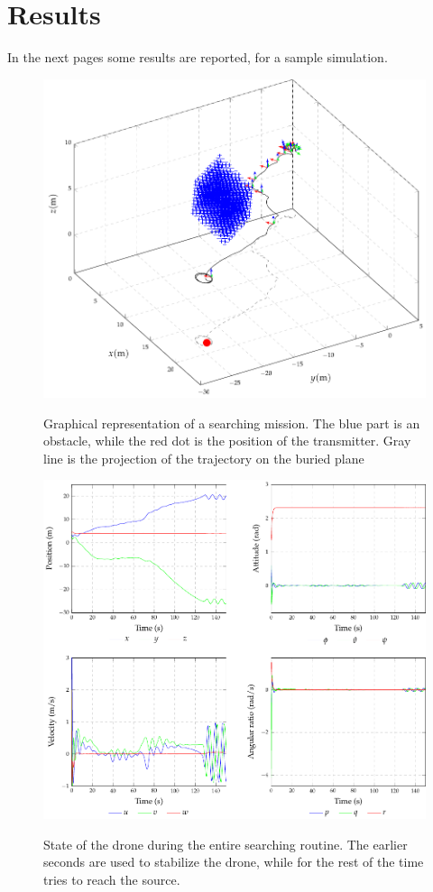 \FloatBarrier

\section{Results}
In the next pages some results are reported, for a sample simulation.

\begin{figure}[f]
	\centering
	\includegraphics[]{ch4/tikz/3Dplot.pdf}
\label{fig:3dplot}
\caption{Graphical representation of a searching mission. The blue part is an obstacle, while the red dot is the position of the transmitter. Gray line is the projection of the trajectory on the buried plane}
\end{figure}

\begin{figure}[f]
	\centering
	\includegraphics[]{ch4/tikz/state.pdf}
\label{fig:state}
\caption{State of the drone during the entire searching routine. The earlier seconds are used to stabilize the drone, while for the rest of the time tries to reach the source.}
\end{figure}

